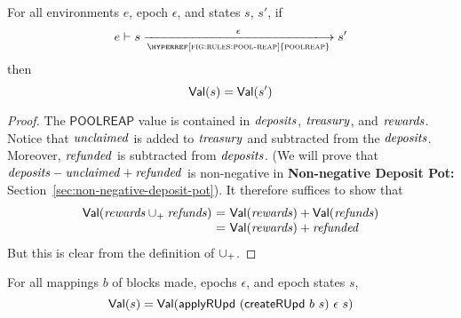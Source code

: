\begin{lemma}
  \label{lemma:poolreap-pres-of-value}
  For all environments $e$, epoch $\epsilon$, and states $s$, $s'$, if
  \begin{equation*}
    e\vdash s\trans{\hyperref[fig:rules:pool-reap]{poolreap}}{\epsilon}s'
  \end{equation*}
  then
  \begin{equation*}
    \mathsf{Val}(s) = \mathsf{Val}(s')
  \end{equation*}
\end{lemma}

\begin{proof}
  The $\mathsf{POOLREAP}$ value is contained in
  $\mathit{deposits}$, $\mathit{treasury}$, and $\mathit{rewards}$.
  Notice that $\mathit{unclaimed}$ is added to $\mathit{treasury}$
  and subtracted from the $\mathit{deposits}$.
  Moreover, $\mathit{refunded}$ is subtracted from $\mathit{deposits}$.
  (We will prove that $\mathit{deposits}-\mathit{unclaimed}+\mathit{refunded}$
  is non-negative in \textbf{Non-negative Deposit Pot:} Section~\ref{sec:non-negative-deposit-pot}).
  It therefore suffices to show that
  \begin{equation*}
    \begin{array}{r@{~=~}l}
    \Val(\var{rewards}\unionoverridePlus\var{refunds})
    & \Val(\var{rewards}) + \Val(\var{refunds})
    \\
    & \Val(\var{rewards}) + \var{refunded}
    \end{array}
  \end{equation*}
  But this is clear from the definition of $\mathbin{\cup_{+}}$.
\end{proof}

\begin{lemma}
  \label{lemma:ru-pres-of-value}
  For all mappings $b$ of blocks made, epochs $\epsilon$, and epoch states $s$,
  \begin{equation*}
    \mathsf{Val}(s) = \mathsf{Val}(\mathsf{applyRUpd}~(\mathsf{createRUpd}~b~s)~\epsilon~s)
  \end{equation*}
\end{lemma}

